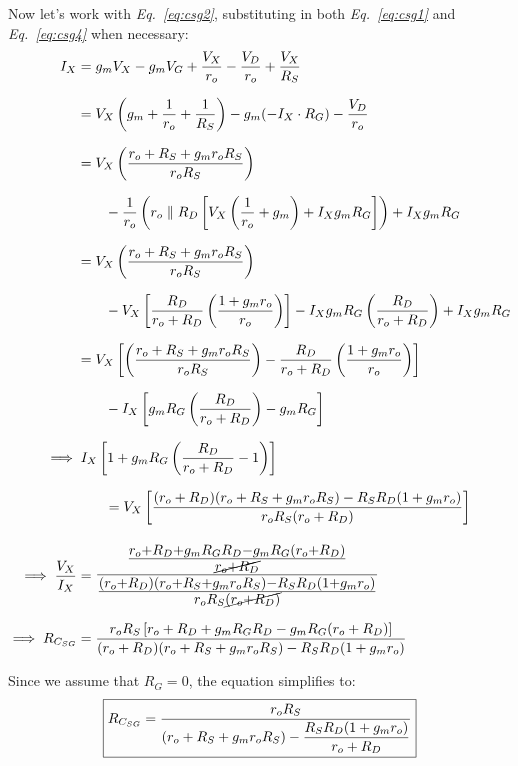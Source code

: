 \documentclass[12pt, fleqn]{article}
\begin{document}
\begin{enumerate}[label=(\alph*)]
    Now let's work with \textit{Eq.~\ref{eq:csg2}}, substituting in both \textit{Eq.~\ref{eq:csg1}} and \textit{Eq.~\ref{eq:csg4}} when necessary:
    \begin{align*}
        I_X &= g_m V_X - g_m V_G + \frac{V_X}{r_o} - \frac{V_D}{r_o} + \frac{V_X}{R_S}\\[0.25cm]
        &= V_X \left(g_m + \frac{1}{r_o} + \frac{1}{R_S}\right) - g_m (-I_X \cdot R_G) - \frac{V_D}{r_o}\\[0.25cm]
        &= V_X \left(\frac{r_o + R_S + g_m r_o R_S}{r_o R_S}\right)\\[0.25cm]
            &\qquad - \frac{1}{r_o}\left(r_o \parallel R_D \left[V_X\left(\frac{1}{r_o} + g_m\right) + I_X g_m R_G\right]\right)
            + I_X g_m R_G\\[0.25cm]
        &= V_X \left(\frac{r_o + R_S + g_m r_o R_S}{r_o R_S}\right)\\[0.25cm]
            &\qquad - V_X \left[\frac{R_D}{r_o + R_D}\left(\frac{1 + g_m r_o}{r_o}\right)\right]
            - I_X g_m R_G\left(\frac{R_D}{r_o + R_D}\right)
            + I_X g_m R_G\\[0.25cm]
        &= V_X \left[\left(\frac{r_o + R_S + g_m r_o R_S}{r_o R_S}\right)
            - \frac{R_D}{r_o + R_D}\left(\frac{1 + g_m r_o}{r_o}\right)\right]\\[0.25cm]
            &\qquad - I_X \left[ g_m R_G\left(\frac{R_D}{r_o + R_D}\right) - g_m R_G \right]\\[0.25cm]
        \implies &\; I_X\left[1 + g_m R_G \left(\frac{R_D}{r_o + R_D} -  1\right)\right]\\[0.25cm]
        &\qquad = V_X \left[\frac{(r_o + R_D)(r_o + R_S + g_m r_o R_S) - R_S R_D(1 + g_m r_o)}{r_o R_S(r_o + R_D)}\right]\\[0.35cm]
        \implies \frac{V_X}{I_X} &= \mathlarger{\mathlarger{\frac{\frac{r_o + R_D + g_m R_G R_D - g_m R_G(r_o + R_D)}{\cancel{r_o + R_D}}}{\frac{(r_o + R_D)(r_o + R_S + g_m r_o R_S) - R_S R_D(1 + g_m r_o)}{r_o R_S\cancel{(r_o + R_D)}}}}}\\[0.25cm]
        \implies R_{C_{SG}} &= \frac{r_o R_S\left[r_o + R_D + g_m R_G R_D - g_m R_G(r_o + R_D)\right]}{(r_o + R_D)(r_o + R_S + g_m r_o R_S) - R_S R_D(1 + g_m r_o)}
    \end{align*}

    Since we assume that $R_G = 0$, the equation simplifies to:
    \begin{equation}
        \boxed{R_{C_{SG}} = \frac{r_o R_S}{(r_o + R_S + g_m r_o R_S) - \mathlarger{\frac{R_S R_D(1 + g_m r_o)}{r_o + R_D}}}}
    \end{equation}
\newpage


\end{enumerate}
\end{document}
